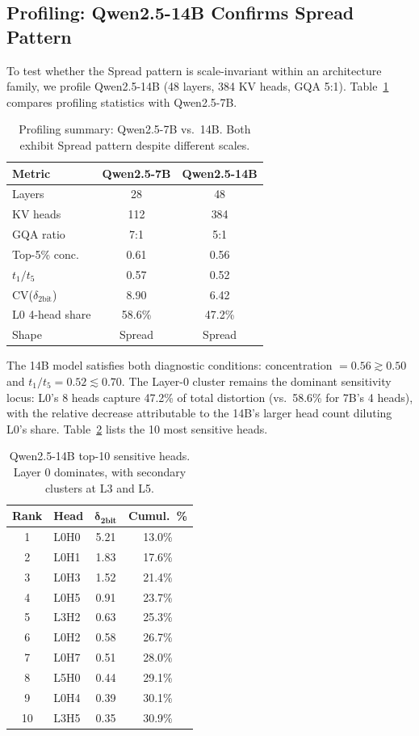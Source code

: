 \documentclass[11pt,a4paper]{article}
\newcommand{\deltab}{\delta_{\text{2bit}}}
\newcommand{\ttf}{t_1/t_5}
\begin{document}
\subsection{Profiling: Qwen2.5-14B Confirms Spread Pattern}
\label{sec:profiling14b}

To test whether the Spread pattern is scale-invariant within an architecture family, we profile Qwen2.5-14B (48 layers, 384 KV heads, GQA 5:1).
Table~\ref{tab:profiling14b} compares profiling statistics with Qwen2.5-7B.

\begin{table}[h]
\centering
\caption{Profiling summary: Qwen2.5-7B vs.\ 14B. Both exhibit Spread pattern despite different scales.}
\label{tab:profiling14b}
\begin{tabular}{lcc}
\toprule
\textbf{Metric} & \textbf{Qwen2.5-7B} & \textbf{Qwen2.5-14B} \\
\midrule
Layers          & 28   & 48   \\
KV heads        & 112  & 384  \\
GQA ratio       & 7:1  & 5:1  \\
Top-5\% conc.   & 0.61 & 0.56 \\
$\ttf$          & 0.57 & 0.52 \\
CV($\deltab$)   & 8.90 & 6.42 \\
L0 4-head share & 58.6\% & 47.2\% \\
Shape           & Spread & Spread \\
\bottomrule
\end{tabular}
\end{table}

The 14B model satisfies both diagnostic conditions: concentration $= 0.56 \gtrsim 0.50$ and $\ttf = 0.52 \lesssim 0.70$.
The Layer-0 cluster remains the dominant sensitivity locus: L0's 8 heads capture 47.2\% of total distortion (vs.\ 58.6\% for 7B's 4 heads), with the relative decrease attributable to the 14B's larger head count diluting L0's share.
Table~\ref{tab:top10_14b} lists the 10 most sensitive heads.

\begin{table}[h]
\centering
\caption{Qwen2.5-14B top-10 sensitive heads. Layer 0 dominates, with secondary clusters at L3 and L5.}
\label{tab:top10_14b}
\begin{tabular}{clcc}
\toprule
\textbf{Rank} & \textbf{Head} & $\boldsymbol{\deltab}$ & \textbf{Cumul.\ \%} \\
\midrule
1  & L0H0 & 5.21 & 13.0\% \\
2  & L0H1 & 1.83 & 17.6\% \\
3  & L0H3 & 1.52 & 21.4\% \\
4  & L0H5 & 0.91 & 23.7\% \\
5  & L3H2 & 0.63 & 25.3\% \\
6  & L0H2 & 0.58 & 26.7\% \\
7  & L0H7 & 0.51 & 28.0\% \\
8  & L5H0 & 0.44 & 29.1\% \\
9  & L0H4 & 0.39 & 30.1\% \\
10 & L3H5 & 0.35 & 30.9\% \\
\bottomrule
\end{tabular}
\end{table}
\end{document}
